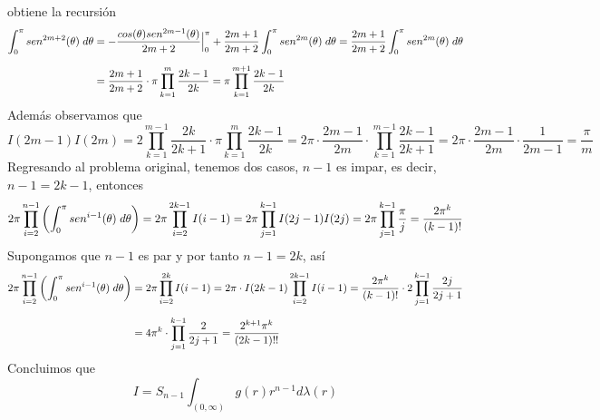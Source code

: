 \documentclass{article}
\begin{document}
\begin{enumerate}
    obtiene la recursión
    \begin{align*}
        \int_{0}^{\pi}sen^{2m+2}(\theta)\hspace{1mm}d\theta &= 
        -\frac{cos(\theta)sen^{2m-1}(\theta)}{2m+2}\Big|_{0}^{\pi}+\frac{2m+1}{2m+2}\int_{0}^{\pi}
        sen^{2m}(\theta)\hspace{1mm}d\theta=\frac{2m+1}{2m+2}\int_{0}^{\pi}sen^{2m}(\theta)
        \hspace{1mm}d\theta \\[2mm]
        &= \frac{2m+1}{2m+2}\cdot\pi\prod_{k=1}^{m}\frac{2k-1}{2k}
        =\pi\prod_{k=1}^{m+1}\frac{2k-1}{2k}
    \end{align*}
    Además observamos que
    \begin{equation*}
        I(2m-1)I(2m)=2\prod_{k=1}^{m-1}\frac{2k}{2k+1}\cdot\pi\prod_{k=1}^{m}\frac{2k-1}{2k}
        =2\pi\cdot\frac{2m-1}{2m}\cdot\prod_{k=1}^{m-1}\frac{2k-1}{2k+1}
        =2\pi\cdot\frac{2m-1}{2m}\cdot\frac{1}{2m-1}=\frac{\pi}{m}
    \end{equation*}
    Regresando al problema original, tenemos dos casos, $n-1$ es impar, es decir, $n-1=2k-1$, 
    entonces
    \begin{equation*}
        2\pi\prod_{i=2}^{n-1}\left(\int_{0}^{\pi}sen^{i-1}(\theta)
        \hspace{1mm}d\theta\right)
        =2\pi\prod_{i=2}^{2k-1}I(i-1)=2\pi\prod_{j=1}^{k-1}I(2j-1)I(2j)
        =2\pi\prod_{j=1}^{k-1}\frac{\pi}{j}=\frac{2\pi^{k}}{(k-1)!}
    \end{equation*}
    Supongamos que $n-1$ es par y por tanto $n-1=2k$, así
    \begin{align*}
        2\pi\prod_{i=2}^{n-1}\left(\int_{0}^{\pi}sen^{i-1}(\theta)
        \hspace{1mm}d\theta\right) &= 2\pi\prod_{i=2}^{2k}I(i-1)=2\pi\cdot I(2k-1)
        \prod_{i=2}^{2k-1}I(i-1)=\frac{2\pi^{k}}{(k-1)!}\cdot2\prod_{j=1}^{k-1}\frac{2j}{2j+1} 
        \\[2mm]
        &= 4\pi^{k}\cdot\prod_{j=1}^{k-1}\frac{2}{2j+1}
        =\frac{2^{k+1}\pi^{k}}{(2k-1)!!}
    \end{align*}
    Concluimos que
    \begin{equation*}
        I=S_{n-1}\int_{(0,\infty)}g(r)r^{n-1}d\lambda(r)
    \end{equation*}
\end{enumerate}
\end{document}
